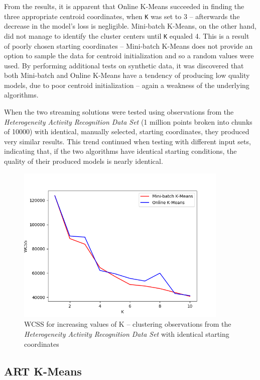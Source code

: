 \documentclass{l4proj}
\begin{document}
From the results, it is apparent that Online K-Means succeeded in finding the three appropriate centroid coordinates, when \texttt{K} was set to 3 -- afterwards the decrease in the model's loss is negligible. Mini-batch K-Means, on the other hand, did not manage to identify the cluster centers until \texttt{K} equaled 4. This is a result of poorly chosen starting coordinates -- Mini-batch K-Means does not provide an option to sample the data for centroid initialization and so a random values were used. By performing additional tests on synthetic data, it was discovered that both Mini-batch and Online K-Means have a tendency of producing low quality models, due to poor centroid initialization -- again a weakness of the underlying algorithms.

When the two streaming solutions were tested using observations from the  \textit{Heterogeneity Activity Recognition Data Set} (1 million points broken into chunks of 10000) with identical, manually selected, starting coordinates, they produced very similar results. This trend continued when testing with different input sets, indicating that, if the two algorithms have identical starting conditions, the quality of their produced models is nearly identical.

\begin{figure}[H]
	\centering
    \label{fig:res11}
    \includegraphics[width=0.9\textwidth]{images/result11}
    \caption{WCSS for increasing values of K -- clustering observations from the \textit{Heterogeneity Activity Recognition Data Set} with identical starting coordinates} 
\end{figure}

\subsection{ART K-Means}
\end{document}
